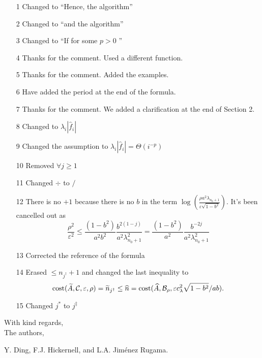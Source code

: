 \documentclass[letter]{article}
\begin{document}
\begin{enumerate}
    \item[1] Changed to ``Hence, the algorithm''
    \item[2] Changed to ``and the algorithm''
    \item[3] Changed to ``If for some $p > 0$ ''
    \item[4] Thanks for the comment. Used a different function.
    \item[5] Thanks for the comment. Added the examples.
    \item[6] Have added the period at the end of the formula.
    \item[7] Thanks for the comment. We added a clarification at the end of Section 2.
    \item[8] Changed to $\lambda_i |\widehat{f}_i|$
    \item[9] Changed the assumption to 
    $\lambda_i |\widehat{f}_i| =\Theta(i^{-p})$
    \item[10] Removed $\forall j  \ge 1$
    \item[11] Changed $\div$ to $/$
    \item[12] There is no $+1$ because there is no $b$ in the term
    $ \log\left(\frac{\rho a^2\lambda_{n_{0}+1} }{\varepsilon \sqrt{1 - b^2}}\right)$.
    It's been cancelled out as
    \[\frac{\rho^2}{\varepsilon^2} \le \frac{(1 - b^2)}{a^2b^2} \frac{b^{2(1-j)}}{a^2\lambda_{n_{0}+1}^2} =  \frac{(1 - b^2)}{a^2} \frac{b^{-2j}}{a^2\lambda_{n_{0}+1}^2}\]
    \item[13] Corrected the reference of the formula
    \item[14] Erased $\le n_{j^\dagger}+1$ and changed the last inequality to
    \[
    \textup{cost}(\widetilde{A},{\mathcal{C}},\varepsilon,\rho) = \widetilde{n}_{j^\dagger} \le  \widehat{n} = \textup{cost}(\widehat{A},{\mathcal{B}}_{\rho},\varepsilon c_{\lambda}^2\sqrt{1 - b^2}/ab).
    \]
    \item[15] Changed $j^*$ to $j^{\ddagger}$
\end{enumerate}

\bigskip

\noindent With kind regards,\\[0.25cm]
The authors, 

\noindent Y. Ding, F.J. Hickernell,  and L.A. Jim\'{e}nez Rugama.
\end{document}
